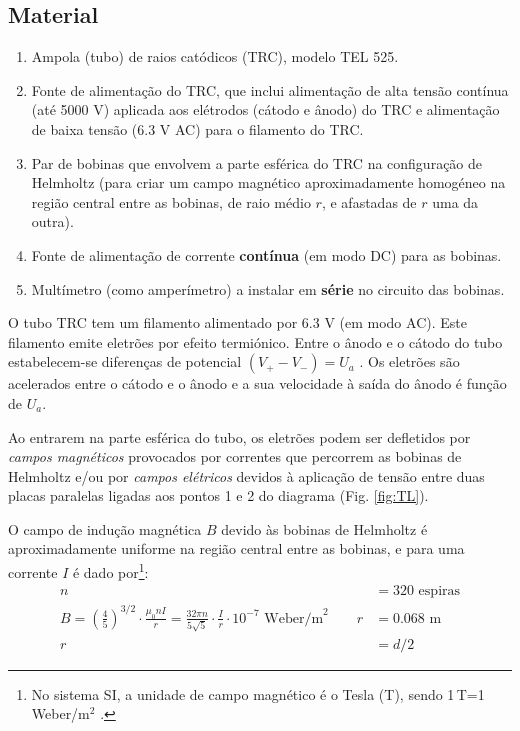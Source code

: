 \documentclass[12pt,a4paper,oneside]{paper}
\begin{document}
\subsection {\sf Material}
\begin{enumerate}
	\item Ampola (tubo) de raios catódicos (TRC), modelo TEL 525.
	\item 	Fonte de alimentação do TRC, que inclui alimentação de alta tensão contínua 
	(até 5000 V) aplicada aos elétrodos (cátodo e ânodo) do TRC e alimentação de baixa tensão
	(6.3 V AC) para o filamento do TRC.
	\item Par de bobinas que envolvem a parte esférica do TRC na configuração de
	Helmholtz (para criar um campo magnético aproximadamente homogéneo na
	região central entre as bobinas, de raio médio $r$, e afastadas de $r$ uma da outra).
	\item Fonte de alimentação de corrente \textbf{contínua} (em modo DC) para as bobinas.
	\item Multímetro (como amperímetro) a instalar em \textbf{série} no circuito das bobinas.
\end{enumerate}

O tubo TRC tem um filamento alimentado por 6.3 V (em modo AC). Este filamento emite eletrões por efeito termiónico. 
Entre o ânodo e o cátodo do tubo estabelecem-se diferenças de potencial $ (V_+ - V_-) = U_a$ . Os eletrões são acelerados entre o cátodo e o ânodo e a sua velocidade à saída do ânodo é função de $U_a$. 

Ao entrarem na parte esférica do tubo, os eletrões podem ser defletidos por \emph{campos magnéticos} provocados por
correntes que percorrem as bobinas de Helmholtz e/ou por \emph{campos elétricos} devidos à aplicação de tensão entre
duas placas paralelas ligadas aos pontos 1 e 2 do diagrama (Fig. \ref{fig:TL}).

O campo de indução magnética $B$ devido às bobinas de Helmholtz é aproximadamente uniforme na região central entre as
bobinas, e para uma corrente $I$ é dado por\footnote{No sistema SI, a unidade de campo magnético é o Tesla (T), sendo
1\,T=1\,Weber/m$^{2}$ .}:
\begin{align}
	\label{eq:helmotz}
	 n &= 320\textrm{ espiras} \nonumber \\ 
B = \left(\frac{4}{5}\right)^{3/2} \cdot \frac{\mu_0 n I}{r} =  \frac{32 \pi n }{5 \sqrt{5}} \cdot \frac{I}{r} \cdot 10^{-7}\textrm{ Weber/m}^{2}
 \qquad  r  &= 0.068\textrm{ m} \\
r  &= d/2 \nonumber
\end{align}
\end{document}
